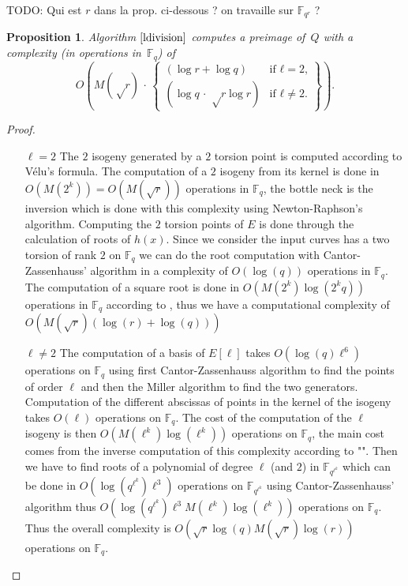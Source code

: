 \documentclass{lms}
\newcommand{\todo}[1]{{\color{red}TODO: #1}}
\newtheorem{prop}[thm]{Proposition}
\def\pa#1{\left(#1\right)}
\begin{document}
\todo{Qui est $r$ dans la prop. ci-dessous ? on travaille sur $\mathbb
F_{q^r}$ ?}
\begin{prop}
Algorithm $\ref{ldivision}$ computes a preimage of~$Q$ with a complexity
(in operations in~$\mathbb{F}_q$) of
\[
O \pa{M(√r) \,· \,\left\lbrace\begin{array}{ll}
 (\log r + \log q) & \text{if $ℓ = 2$,} \\
 (\log q \,·\, √{r} \log r) & \text{if $ℓ ≠ 2$.}
\end{array}\right\rbrace}.
\]
 
\end{prop}

\begin{proof}
\begin{enumerate}
\item[$\ell = 2$]
The $2$ isogeny generated by a $2$ torsion point is computed according to Vélu's formula.
The computation of a $2$ isogeny from its kernel is done in $O(M(2^k))=O(M(\sqrt{r}))$ operations in $\mathbb{F}_q$, the bottle neck is the inversion which is done with this complexity using Newton-Raphson's algorithm.
\newline
Computing the $2$ torsion points of $E$ is done through the calculation of roots of $h(x)$.
Since we consider the input curves has a two torsion of rank $2$ on $\mathbb{F}_q$ we can do the root computation with Cantor-Zassenhauss' algorithm in a complexity of $O( \log(q))$ operations in $\mathbb{F}_q$. 
The computation of a square root is done in $O(M(2^k)\log(2^kq))$ operations in $\mathbb{F}_q$ according to \cite{DBLP:journals/dcc/DoliskaniS15}, thus we have a computational complexity of $O(M(\sqrt{r})(\log(r)+\log(q)))$
\item[$\ell \neq 2$]The computation of a basis of $E[\ell]$ takes $O(\log(q)\ell^6 )$ operations on $\mathbb{F}_q$ using first Cantor-Zassenhauss algorithm to find the points of order $\ell$ and then the Miller algorithm to find  the two generators. Computation of the different abscissas of points in the kernel of the isogeny takes $O(\ell )$ operations on $\mathbb{F}_q$. The cost of the computation of the $\ell$ isogeny is then $O(M(\ell^k)\log(\ell^k))$ operations on $\mathbb{F}_{q}$, the main cost comes from the inverse computation of this complexity according to "\cite{DeDoSc13}". Then we have to find roots of a polynomial of degree $\ell$ (and $2$) in $\mathbb{F}_{q^{\ell^k}}$ which can be done in $O(\log(q^{\ell^k})\ell^3)$ operations on $\mathbb{F}_{q^{\ell^k}}$ using Cantor-Zassenhauss' algorithm thus $O(\log(q^{\ell^k})\ell^3 M(\ell^k)\log(\ell^k))$ operations on $\mathbb{F}_q$. Thus the overall complexity is $O(\sqrt{r} \log(q) M(\sqrt{r})\log(r))$ operations on $\mathbb{F}_q$.
\end{enumerate}
\end{proof}
\end{document}
